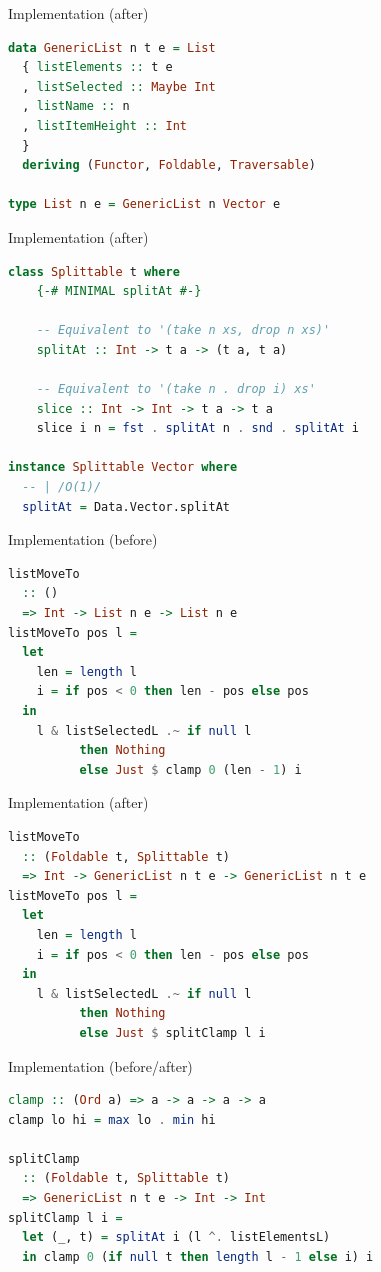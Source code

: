 \documentclass[ignorenonframetext,aspectratio=169,dvipsnames]{beamer}
\begin{document}
\begin{frame}[fragile]{Implementation (after)}
\begin{lstlisting}[language=Haskell]
data GenericList n t e = List
  { listElements :: t e
  , listSelected :: Maybe Int
  , listName :: n
  , listItemHeight :: Int
  }
  deriving (Functor, Foldable, Traversable)

type List n e = GenericList n Vector e
\end{lstlisting}
\end{frame}

\begin{frame}[fragile]{Implementation (after)}
\begin{lstlisting}[language=Haskell]
class Splittable t where
    {-# MINIMAL splitAt #-}

    -- Equivalent to '(take n xs, drop n xs)'
    splitAt :: Int -> t a -> (t a, t a)

    -- Equivalent to '(take n . drop i) xs'
    slice :: Int -> Int -> t a -> t a
    slice i n = fst . splitAt n . snd . splitAt i

instance Splittable Vector where
  -- | /O(1)/
  splitAt = Data.Vector.splitAt
\end{lstlisting}
\end{frame}

\begin{frame}[fragile]{Implementation (before)}
\begin{lstlisting}[language=Haskell]
listMoveTo
  :: ()
  => Int -> List n e -> List n e
listMoveTo pos l =
  let
    len = length l
    i = if pos < 0 then len - pos else pos
  in
    l & listSelectedL .~ if null l
          then Nothing
          else Just $ clamp 0 (len - 1) i
\end{lstlisting}
\end{frame}

\begin{frame}[fragile]{Implementation (after)}
\begin{lstlisting}[language=Haskell]
listMoveTo
  :: (Foldable t, Splittable t)
  => Int -> GenericList n t e -> GenericList n t e
listMoveTo pos l =
  let
    len = length l
    i = if pos < 0 then len - pos else pos
  in
    l & listSelectedL .~ if null l
          then Nothing
          else Just $ splitClamp l i
\end{lstlisting}
\end{frame}

\begin{frame}[fragile]{Implementation (before/after)}
\begin{lstlisting}[language=Haskell]
clamp :: (Ord a) => a -> a -> a -> a
clamp lo hi = max lo . min hi

splitClamp
  :: (Foldable t, Splittable t)
  => GenericList n t e -> Int -> Int
splitClamp l i =
  let (_, t) = splitAt i (l ^. listElementsL)
  in clamp 0 (if null t then length l - 1 else i) i
\end{lstlisting}
\end{frame}
\end{document}
